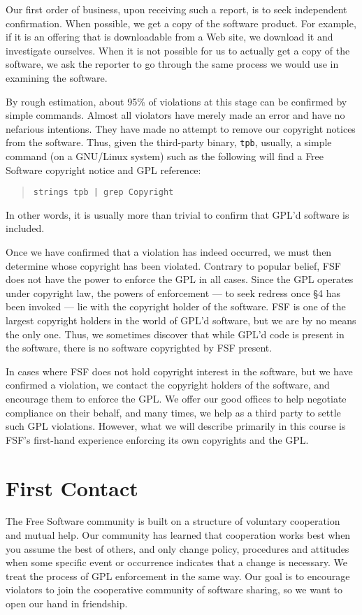 Our first order of business, upon receiving such a report, is to seek
independent confirmation. When possible, we get a copy of the software
product. For example, if it is an offering that is downloadable from a
Web site, we download it and investigate ourselves. When it is not
possible for us to actually get a copy of the software, we ask the
reporter to go through the same process we would use in examining the
software.

By rough estimation, about 95\% of violations at this stage can be
confirmed by simple commands. Almost all violators have merely made an
error and have no nefarious intentions. They have made no attempt to
remove our copyright notices from the software. Thus, given the
third-party binary, {\tt tpb}, usually, a simple command (on a GNU/Linux
system) such as the following will find a Free Software copyright notice
and GPL reference:
\begin{quotation}
{\tt strings tpb | grep Copyright}
\end{quotation}
In other words, it is usually more than trivial to confirm that GPL'd
software is included.

Once we have confirmed that a violation has indeed occurred, we must then
determine whose copyright has been violated. Contrary to popular belief,
FSF does not have the power to enforce the GPL in all cases. Since the GPL
operates under copyright law, the powers of enforcement --- to seek
redress once \S 4 has been invoked --- lie with the copyright holder of
the software. FSF is one of the largest copyright holders in the world of
GPL'd software, but we are by no means the only one. Thus, we sometimes
discover that while GPL'd code is present in the software, there is no
software copyrighted by FSF present.

In cases where FSF does not hold copyright interest in the software, but
we have confirmed a violation, we contact the copyright holders of the
software, and encourage them to enforce the GPL\@. We offer our good offices
to help negotiate compliance on their behalf, and many times, we help as a
third party to settle such GPL violations. However, what we will describe
primarily in this course is FSF's first-hand experience enforcing its own
copyrights and the GPL\@.

\section{First Contact}

The Free Software community is built on a structure of voluntary
cooperation and mutual help. Our community has learned that cooperation
works best when you assume the best of others, and only change policy,
procedures and attitudes when some specific event or occurrence indicates
that a change is necessary. We treat the process of GPL enforcement in
the same way. Our goal is to encourage violators to join the cooperative
community of software sharing, so we want to open our hand in friendship.

